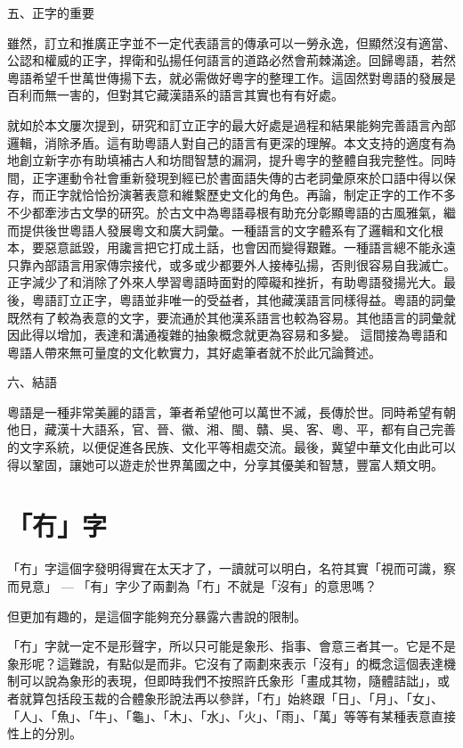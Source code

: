 五、正字的重要

雖然，訂立和推廣正字並不一定代表語言的傳承可以一勞永逸，但顯然沒有適當、公認和權威的正字，捍衛和弘揚任何語言的道路必然會荊棘滿途。回歸粵語，若然粵語希望千世萬世傳揚下去，就必需做好粵字的整理工作。這固然對粵語的發展是百利而無一害的，但對其它藏漢語系的語言其實也有有好處。

就如於本文屢次提到，研究和訂立正字的最大好處是過程和結果能夠完善語言內部邏輯，消除矛盾。這有助粵語人對自己的語言有更深的理解。本文支持的適度有為地創立新字亦有助填補古人和坊間智慧的漏洞，提升粵字的整體自我完整性。同時間，正字運動令社會重新發現到經已於書面語失傳的古老詞彙原來於口語中得以保存，而正字就恰恰扮演著表意和維繫歷史文化的角色。再論，制定正字的工作不多不少都牽涉古文學的研究。於古文中為粵語尋根有助充分彰顯粵語的古風雅氣，繼而提供後世粵語人發展粵文和廣大詞彙。一種語言的文字體系有了邏輯和文化根本，要惡意詆毀，用讒言把它打成土話，也會因而變得艱難。一種語言總不能永遠只靠內部語言用家傳宗接代，或多或少都要外人接棒弘揚，否則很容易自我滅亡。正字減少了和消除了外來人學習粵語時面對的障礙和挫折，有助粵語發揚光大。最後，粵語訂立正字，粵語並非唯一的受益者，其他藏漢語言同樣得益。粵語的詞彙既然有了較為表意的文字，要流通於其他漢系語言也較為容易。其他語言的詞彙就因此得以增加，表達和溝通複雜的抽象概念就更為容易和多變。 這間接為粵語和粵語人帶來無可量度的文化軟實力，其好處筆者就不於此冗論贅述。

六、結語

粵語是一種非常美麗的語言，筆者希望他可以萬世不滅，長傳於世。同時希望有朝他日，藏漢十大語系，官、晉、徽、湘、閩、贛、吳、客、粵、平，都有自己完善的文字系統，以便促進各民族、文化平等相處交流。最後，冀望中華文化由此可以得以鞏固，讓她可以遊走於世界萬國之中，分享其優美和智慧，豐富人類文明。






\section{「冇」字}
「冇」字這個字發明得實在太天才了，一讀就可以明白，名符其實「視而可識，察而見意」 — 「有」字少了兩劃為「冇」不就是「沒有」的意思嗎？

但更加有趣的，是這個字能夠充分暴露六書說的限制。

「冇」字就一定不是形聲字，所以只可能是象形、指事、會意三者其一。它是不是象形呢？這難說，有點似是而非。它沒有了兩劃來表示「沒有」的概念這個表達機制可以說為象形的表現，但即時我們不按照許氏象形「畫成其物，隨體詰詘」，或者就算包括段玉裁的合體象形說法再以參詳，「冇」始終跟「日」、「月」、「女」、「人」、「魚」、「牛」、「龜」、「木」、「水」、「火」、「雨」、「萬」等等有某種表意直接性上的分別。

